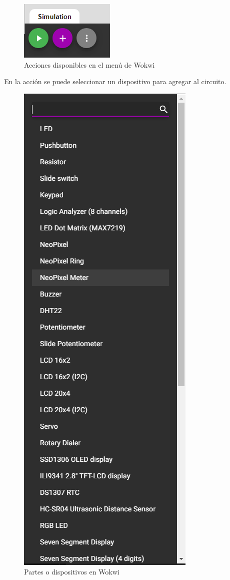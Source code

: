 \documentclass{article}
\begin{document}
    \begin{figure}[H]
        \centering
        \includegraphics[width=0.2\paperwidth]{images/wokwi-actions}
        \caption{Acciones disponibles en el menú de Wokwi}
    \end{figure}

    En la acción  se puede seleccionar un dispositivo para agregar al circuito.

    \begin{figure}[H]
        \centering
        \includegraphics[width=0.2\paperwidth]{images/wokwi-parts}
        \caption{Partes o dispositivos en Wokwi}
    \end{figure}
\end{document}

